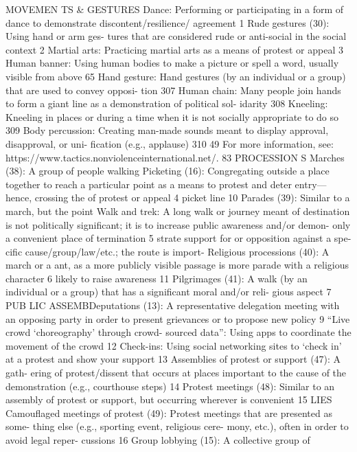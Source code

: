 \documentclass[twoside,a4paper,12pt,fleqn,openany]{extbook}
\begin{document}
MOVEMEN TS & GESTURES
Dance: Performing or participating in a form of
dance to demonstrate discontent/resilience/
agreement
 1
Rude gestures (30): Using hand or arm ges-
tures that are considered rude or anti-social in
the social context
 2
Martial arts: Practicing martial arts as a means
of protest or appeal
 3
Human banner: Using human bodies to make
a picture or spell a word, usually visible from
above
 65
Hand gesture: Hand gestures (by an individual
or a group) that are used to convey opposi-
tion
 307
Human chain: Many people join hands to form
a giant line as a demonstration of political sol-
idarity
 308
Kneeling: Kneeling in places or during a time
when it is not socially appropriate to do so		
309
Body percussion: Creating man-made sounds
meant to display approval, disapproval, or uni-
fication (e.g., applause)
 310
49
 For more information, see: https://www.tactics.nonviolenceinternational.net/.
83
PROCESSION S
Marches (38): A group of people walking
 Picketing (16): Congregating outside a place
together to reach a particular point as a means
 to protest and deter entry—hence, crossing the
of protest or appeal
 4
 picket line
 10
Parades (39): Similar to a march, but the point
 Walk and trek: A long walk or journey meant
of destination is not politically significant; it is
 to increase public awareness and/or demon-
only a convenient place of termination
 5
 strate support for or opposition against a spe-
cific cause/group/law/etc.; the route is import-
Religious processions (40): A march or a
 ant, as a more publicly visible passage is more
parade with a religious character
 6
 likely to raise awareness
 11
Pilgrimages (41): A walk (by an individual or a
group) that has a significant moral and/or reli-
gious aspect
 7
PUB LIC ASSEMBDeputations (13): A representative delegation
meeting with an opposing party in order to
present grievances or to propose new policy		
9
“Live crowd ‘choreography’ through crowd-
sourced data”: Using apps to coordinate the
movement of the crowd
 12
Check-ins: Using social networking sites to
‘check in’ at a protest and show your support
13
Assemblies of protest or support (47): A gath-
ering of protest/dissent that occurs at places
important to the cause of the demonstration
(e.g., courthouse steps)
 14
Protest meetings (48): Similar to an assembly
of protest or support, but occurring wherever
is convenient
 15
LIES
Camouflaged meetings of protest (49):
Protest meetings that are presented as some-
thing else (e.g., sporting event, religious cere-
mony, etc.), often in order to avoid legal reper-
cussions
 16
Group lobbying (15): A collective group of
\end{document}
